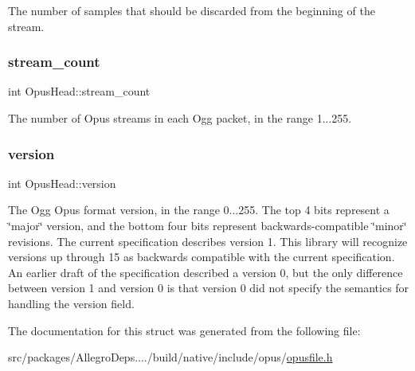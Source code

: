 The number of samples that should be discarded from the beginning of the stream. \mbox{\label{struct_opus_head_a241b040792d2181f3ff6fa7e9911ac40}} 
\subsubsection{\texorpdfstring{stream\+\_\+count}{stream\_count}}
{\footnotesize\ttfamily int Opus\+Head\+::stream\+\_\+count}

The number of Opus streams in each Ogg packet, in the range 1...255. \mbox{\label{struct_opus_head_a9b0e040fc6404ddc2b1fdbccf505f71e}} 
\subsubsection{\texorpdfstring{version}{version}}
{\footnotesize\ttfamily int Opus\+Head\+::version}

The Ogg Opus format version, in the range 0...255. The top 4 bits represent a \char`\"{}major\char`\"{} version, and the bottom four bits represent backwards-\/compatible \char`\"{}minor\char`\"{} revisions. The current specification describes version 1. This library will recognize versions up through 15 as backwards compatible with the current specification. An earlier draft of the specification described a version 0, but the only difference between version 1 and version 0 is that version 0 did not specify the semantics for handling the version field. 

The documentation for this struct was generated from the following file\+:\begin{DoxyCompactItemize}
\item 
src/packages/\+Allegro\+Deps..../build/native/include/opus/\hyperlink{opusfile_8h}{opusfile.\+h}\end{DoxyCompactItemize}
